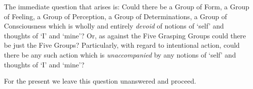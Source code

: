 The immediate question that arises is: Could there be a Group of Form, a Group of Feeling, a Group of Perception, a Group of Determinations, a Group of Consciousness which is wholly and entirely \emph{devoid} of notions of `self' and thoughts of `I' and `mine'? Or, as against the Five Grasping Groups could there be just the Five Groups? Particularly, with regard to intentional action, could there be any such action which is \emph{unaccompanied} by any notions of `self' and thoughts of `I' and `mine'?

For the present we leave this question unanswered and proceed.
